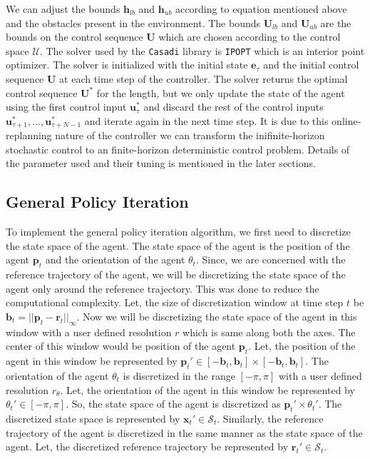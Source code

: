 \documentclass[conference]{IEEEtran}
\begin{document}
We can adjust the bounds $\mathbf{h}_{lb}$ and $\mathbf{h}_{ub}$ according to equation mentioned above and the obstacles present in the environment. The bounds $\mathbf{U}_{lb}$ and $\mathbf{U}_{ub}$ are the bounds on the control sequence $\mathbf{U}$ which are chosen according to the control space $\mathcal{U}$.
The solver used by the \texttt{Casadi} library is \texttt{IPOPT} which is an interior point optimizer. The solver is initialized with the initial state $\mathbf{e}_\tau$ and the initial control sequence $\mathbf{U}$ at each time step of the controller.
The solver returns the optimal control sequence $\mathbf{U}^*$ for the length, but we only update the state of the agent using the first control input $\mathbf{u}_\tau^*$ and discard the rest of the control inputs $\mathbf{u}_{\tau+1}^*, \dots, \mathbf{u}_{\tau+N-1}^*$ and iterate again in the next time step.
It is due to this online-replanning nature of the controller we can transform the inifinite-horizon stochastic control to an finite-horizon deterministic control problem.
Details of the parameter used and their tuning is mentioned in the later sections.

\subsection{General Policy Iteration}
To implement the general policy iteration algorithm, we first need to discretize the state space of the agent.
The state space of the agent is the position of the agent $\mathbf{p}_t$ and the orientation of the agent $\theta_t$. Since, we are 
concerned with the reference trajectory of the agent, we will be discretizing the state space of the agent only around the reference trajectory. This was done to reduce the computational complexity. Let,
the size of discretization window at time step $t$ be $\mathbf{b}_t = ||\mathbf{p}_t - \mathbf{r}_t||_{\infty}$. Now we will be discretizing the state space of the agent in this window with a user defined resolution $r$ which is same along both the axes.
The center of this window would be position of the agent $\mathbf{p}_t$. Let, the position of the agent in this window be represented by $\mathbf{p}_t'\in [-\mathbf{b}_t, \mathbf{b}_t] \times [-\mathbf{b}_t, \mathbf{b}_t]$. The orientation of the agent $\theta_t$ is discretized in the range $[-\pi, \pi]$ with a user defined resolution $r_\theta$. Let, the orientation of the agent in this window be represented by $\theta_t' \in [-\pi, \pi]$. So, the state space of the agent is discretized as $\mathbf{p}_t' \times \theta_t'$. 
The discretized state space is represented by $\mathbf{x}_t' \in \mathcal{S}_t$. Similarly, the reference trajectory of the agent is discretized in the same manner as the state space of the agent. Let, the discretized reference trajectory be represented by $\mathbf{r}_t' \in \mathcal{S}_t$.
\end{document}
